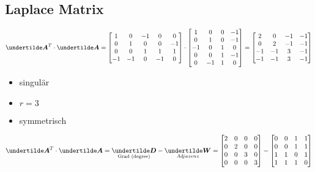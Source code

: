 \subsection{Laplace Matrix}
\begin{align*}
\ma{A}^T\cdot\ma{A} = \begin{bmatrix}
1 & 0 & -1 & 0 & 0\\ 
0 & 1 & 0 & 0 & -1 \\ 
0 & 0 & 1 & 1 & 1 \\ 
-1 & -1 & 0 & -1 & 0
\end{bmatrix}\cdot\begin{bmatrix}
1 & 0 & 0 & -1 \\ 
0 & 1 & 0 & -1 \\ 
-1 & 0 & 1 & 0 \\ 
0 & 0 & 1 & -1 \\ 
0 & -1 & 1 & 0
\end{bmatrix} = \begin{bmatrix}
2 & 0 & -1 & -1 \\ 
0 & 2 & -1 & -1 \\ 
-1 & -1 & 3 & -1 \\ 
-1 & -1 & 3 & -1
\end{bmatrix}  
\end{align*}
\begin{itemize}
\item singulär
\item $r = 3$
\item symmetrisch
\end{itemize}
\begin{align*}
\ma{A}^T\cdot\ma{A} = \underset{\text{Grad (degree)}}{\ma{D}} - \underset{Adjazenz}{\ma{W}} = \begin{bmatrix}
2 & 0 & 0 & 0 \\ 
0 & 2 & 0 & 0 \\ 
0 & 0 & 3 & 0 \\ 
0 & 0 & 0 & 3
\end{bmatrix} - \begin{bmatrix}
0 & 0 & 1 & 1 \\ 
0 & 0 & 1 & 1 \\ 
1 & 1 & 0 & 1 \\ 
1 & 1 & 1 & 0
\end{bmatrix} 
\end{align*}


